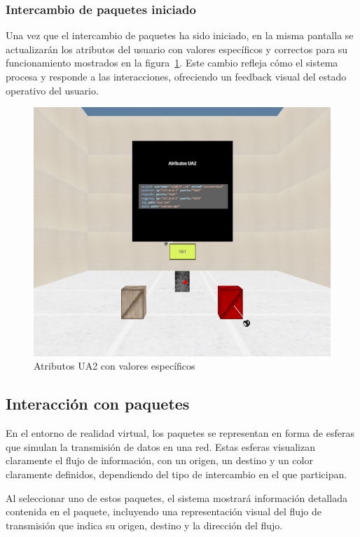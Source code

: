\documentclass[a4paper, 12pt]{book}
\begin{document}
\subsubsection{Intercambio de paquetes iniciado}
\label{subsubsec:Intercambio_Iniciado}
Una vez que el intercambio de paquetes ha sido iniciado, en la misma pantalla se 
actualizarán los atributos del usuario con valores específicos y correctos para su funcionamiento mostrados en la figura~\ref{fig:UA2_Iniciado}.  
Este cambio refleja cómo el sistema procesa y responde a las interacciones, ofreciendo un feedback visual del estado operativo del usuario.

\begin{figure}
  \centering
  \includegraphics[width=15cm, keepaspectratio]{img/resultados/UA2_Iniciado.png}
  \caption{Atributos UA2 con valores específicos}
  \label{fig:UA2_Iniciado}
\end{figure}


\subsection{Interacción con paquetes}
\label{subsec:objeto_paquetes}
En el entorno de realidad virtual, los paquetes se representan en forma de esferas que simulan la transmisión de datos en una red. 
Estas esferas visualizan claramente el flujo de información, con un origen, un destino y un color claramente definidos, 
dependiendo del tipo de intercambio en el que participan.

Al seleccionar uno de estos paquetes, el sistema mostrará información detallada contenida en el paquete, 
incluyendo una representación visual del flujo de transmisión que indica su origen, destino y la dirección del flujo.
\end{document}

